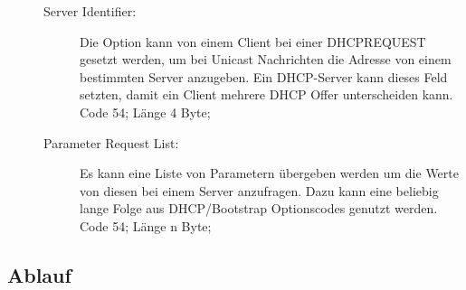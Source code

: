 \begin{description}
\begin{description}
\begin{itemize}
	\end{itemize}
	
	\item[Server Identifier:] Die Option kann von einem Client bei einer DHCPREQUEST gesetzt werden, um bei Unicast Nachrichten die Adresse von einem bestimmten Server anzugeben. Ein DHCP-Server kann dieses Feld setzten, damit ein Client mehrere DHCP Offer unterscheiden kann. \\
	Code 54; Länge 4 Byte;
	
	
	\item[Parameter Request List:] Es kann eine Liste von Parametern übergeben werden um die Werte von diesen bei einem Server anzufragen. Dazu kann eine beliebig lange Folge aus DHCP/Bootstrap Optionscodes genutzt werden.\\
	Code 54; Länge n Byte;	
\end{description}
\end{description}
\subsection{Ablauf}

